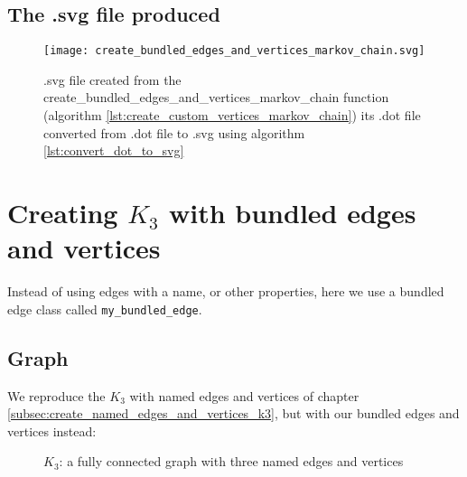 

\subsection{The .svg file produced}

\begin{figure}[!htbp]
  \texttt{[image: create\_bundled\_edges\_and\_vertices\_markov\_chain.svg]}
  \caption{
    .svg file created from the create\_bundled\_edges\_and\_vertices\_markov\_chain function 
    (algorithm  \ref{lst:create_custom_vertices_markov_chain}) 
    its .dot file converted from .dot file to .svg using algorithm 
    \ref{lst:convert_dot_to_svg}
  }
  \label{fig:create_bundled_edges_and_vertices_markov_chain.svg}
\end{figure}

\section{Creating $K_{3}$  with bundled edges and vertices}
\label{subsec:create_bundled_edges_and_vertices_k3}

Instead of using edges with a name, or other properties, here we use a bundled
edge class called \verb;my_bundled_edge;.

\subsection{Graph}

We reproduce the $K_{3}$ with named edges and vertices of chapter 
\ref{subsec:create_named_edges_and_vertices_k3}, 
but with our bundled edges and vertices instead:

\begin{figure}
  \caption{$K_{3}$: a fully connected graph with three named edges and vertices }
  \label{fig:create_bundled_edges_and_vertices_k3}
\end{figure}


